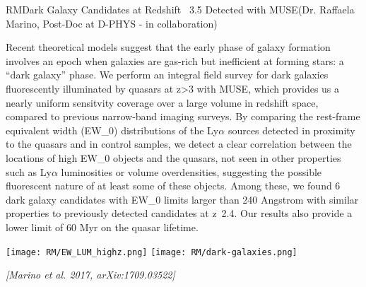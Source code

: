 \begin{section}{RM}{Dark Galaxy Candidates at Redshift ~3.5 Detected with
    MUSE}{(Dr. Raffaela Marino, Post-Doc at D-PHYS - in collaboration)}
  \begin{minipage}[l]{\textwidth}

    {\small Recent theoretical models suggest that the early phase of galaxy
      formation involves an epoch when galaxies are gas-rich but inefficient
      at forming stars: a ``dark galaxy'' phase. We perform an integral field
      survey for dark galaxies fluorescently illuminated by quasars at z>3
      with MUSE, which provides us a nearly uniform sensitvity coverage over a
      large volume in redshift space, compared to previous narrow-band imaging
      surveys. By comparing the rest-frame equivalent width (EW\_0)
      distributions of the Ly$\alpha$ sources detected in proximity to the
      quasars and in control samples, we detect a clear correlation between
      the locations of high EW\_0 objects and the quasars, not seen in other
      properties such as Ly$\alpha$ luminosities or volume overdensities,
      suggesting the possible fluorescent nature of at least some of these
      objects. Among these, we found 6 dark galaxy candidates with EW\_0 limits
      larger than 240 Angstrom with similar properties to previously detected
      candidates at z~2.4. Our results also provide a lower limit of 60 Myr on
      the quasar lifetime.}
  \end{minipage}

  \vspace{0.5cm}

  \begin{minipage}[t]{\linewidth}
    \begin{center}
      \texttt{[image: RM/EW\_LUM\_highz.png]}
      \texttt{[image: RM/dark-galaxies.png]}
    \end{center}
  \end{minipage}

  \vspace{0.5cm}

  {\footnotesize \textit{[Marino et al. 2017, arXiv:1709.03522]}}
\end{section}